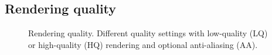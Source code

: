 \documentclass[appendixprefix,a4paper]{scrreprt}
\begin{document}
\subsection{Rendering quality}

\begin{figure}
\centering
{}
\caption[Rendering quality]{Rendering quality. Different quality settings with 
low-quality (LQ) or high-quality (HQ) rendering and optional anti-aliasing 
(AA).}
\label{fig:quality}
\end{figure}
\end{document}
